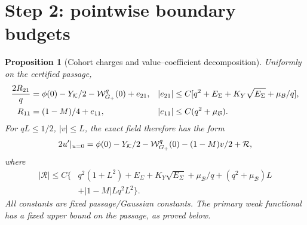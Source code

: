 \documentclass[11pt]{article}
\numberwithin{equation}{section}
\newtheorem{proposition}[theorem]{Proposition}
\theoremstyle{remark}\newtheorem{remark}[theorem]{Remark}
\newcommand{\BB}{\mathcal B}\newcommand{\Gp}{{G_+}}
\newcommand{\ph}{\phi(0)}\newcommand{\WW}{\mathcal W}
\begin{document}
\section{Step 2: pointwise boundary budgets}
\begin{proposition}[Cohort charges and value--coefficient decomposition]
\label{an03wbrv1:budget}
Uniformly on the certified passage,
\begin{align}
 \frac{2R_{21}}q&=\ph-Y_\KK/2-\WW_\Gp^q(0)+e_{21},
 &|e_{21}|&\le C[q^2+E_\Sigma+K_Y\sqrt{E_\Sigma}+\mu_\BB/q],
 \label{an03wbrv1:21budget}\\
 R_{11}&=(1-M)/4+e_{11},
 &|e_{11}|&\le C(q^2+\mu_\BB).
 \label{an03wbrv1:11budget}
\end{align}
For $qL\le1/2$, $|v|\le L$, the exact field therefore has the form
\begin{equation}
 2u'|_{u=0}=\ph-Y_\KK/2-\WW_\Gp^q(0)-(1-M)v/2+\mathcal R,
 \label{an03wbrv1:leading}
\end{equation}
where
\begin{align}
 |\mathcal R|\le C\{&q^2(1+L^2)+E_\Sigma+K_Y\sqrt{E_\Sigma}
 +\mu_\BB/q+(q^2+\mu_\BB)L
 \nonumber\\[-2pt]
 &+|1-M|Lq^2L^2\}.
 \label{an03wbrv1:remainder}
\end{align}
All constants are fixed passage/Gaussian constants. The primary weak
functional has a fixed upper bound on the passage, as proved below.
\end{proposition}
\end{document}
